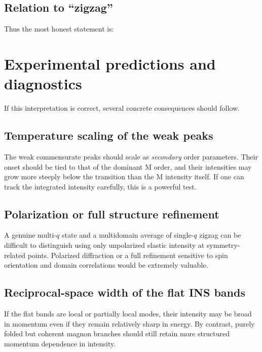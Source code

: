 \documentclass[11pt]{article}
\begin{document}
\subsection*{Relation to ``zigzag''}

Thus the most honest statement is:
\begin{center}
\end{center}

\section{Experimental predictions and diagnostics}

If this interpretation is correct, several concrete consequences should follow.

\subsection{Temperature scaling of the weak peaks}

The weak commensurate peaks should scale as \emph{secondary} order parameters. Their onset should be tied to that of the dominant M order, and their intensities may grow more steeply below the transition than the M intensity itself. If one can track the integrated intensity carefully, this is a powerful test.

\subsection{Polarization or full structure refinement}

A genuine multi-$q$ state and a multidomain average of single-$q$ zigzag can be difficult to distinguish using only unpolarized elastic intensity at symmetry-related points. Polarized diffraction or a full refinement sensitive to spin orientation and domain correlations would be extremely valuable.

\subsection{Reciprocal-space width of the flat INS bands}

If the flat bands are local or partially local modes, their intensity may be broad in momentum even if they remain relatively sharp in energy. By contrast, purely folded but coherent magnon branches should still retain more structured momentum dependence in intensity.
\end{document}
